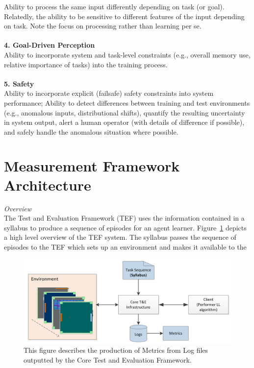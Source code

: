 Ability to process the same input differently depending on task (or goal). Relatedly, the ability to be sensitive to different features of the input depending on task. Note the focus on processing rather than learning per se.\\
\\
\textbf{4. Goal-Driven Perception}\\

Ability to incorporate system and task-level constraints (e.g., overall memory use, relative importance of tasks) into the training process.\\
\\
\textbf{5. Safety}\\

Ability to incorporate explicit (failsafe) safety constraints into system performance; Ability to detect differences between training and test environments (e.g., anomalous inputs, distributional shifts), quantify the resulting uncertainty in system output, alert a human operator (with details of difference if possible), and safely handle the anomalous situation where possible.

\section*{Measurement Framework Architecture}

\textit{Overview}
\\

The Test and Evaluation Framework (TEF) uses the information contained in a syllabus to produce a sequence of episodes for an agent learner. Figure~\ref{fig:systemlayout} depicts a high level overview of the TEF system. The syllabus passes the sequence of episodes to the TEF which sets up an environment and makes it available to the 

\begin{figure}[h]
	\centering
	\includegraphics[width=0.85\columnwidth]{sections/figs/metrics_diagram.png}
	\caption{This figure describes the production of Metrics from Log files outputted by the Core Test and Evaluation Framework.}
	\label{fig:systemlayout}
\end{figure}

